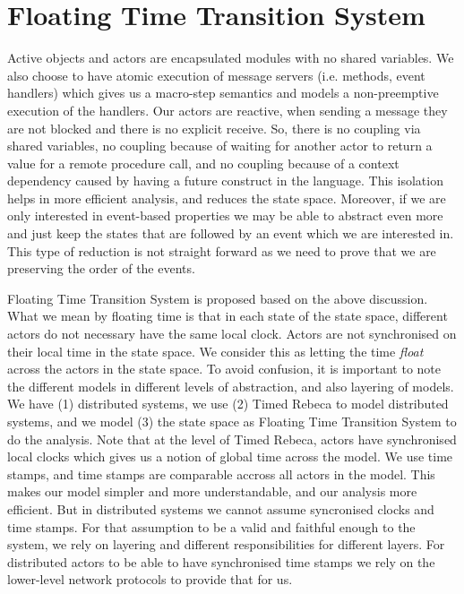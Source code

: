\section{Floating Time Transition System} \label{sec::FTTS}
Active objects and actors are encapsulated modules with no shared variables. We also choose to have atomic execution of message servers (i.e. methods, event handlers) which gives us a macro-step semantics and models a non-preemptive execution of the handlers.
Our actors are reactive, when sending a message they are not blocked and there is no explicit receive. So, there is no coupling via shared variables, no coupling because of waiting for another actor to return a value for a remote procedure call, and no coupling because of a context dependency caused by having a future  construct in the language.
This isolation helps in more efficient analysis, and reduces the state space.
Moreover, if we are only interested in event-based properties we may be able to abstract even more and just keep the states that are followed by an event which we are interested in. This type of reduction is not straight forward as we need to prove that we are preserving the order of the events.

Floating Time Transition System is proposed based on the above discussion. What we mean by floating time is that in each state of the state space, different actors do not necessary have the same local clock. Actors are not synchronised on their local time in the state space. We consider this as letting the time \textit{float} across the actors in the state space. 
To avoid confusion, it is important to note the different models in different levels of abstraction, and also layering of models. We have (1) distributed systems, we use (2) Timed Rebeca to model distributed systems, and we model (3) the state space as Floating Time Transition System to do the analysis. 
%
Note that at the level of Timed Rebeca, actors have synchronised local clocks which gives us a notion of global time across the model. We use time stamps, and time stamps are comparable accross all actors in the model. This makes our model simpler and more understandable, and our analysis more efficient.
But in distributed systems we cannot assume syncronised clocks and time stamps. 
For that assumption to be a valid and faithful enough to the system,  we rely on layering and different responsibilities for different layers. For distributed actors to be able to have synchronised time stamps we rely on the lower-level network protocols to provide that for us. 

